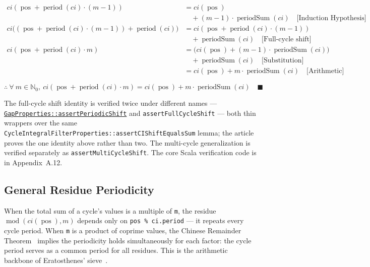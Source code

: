 \begin{equation*}
\begin{aligned}
ci(\operatorname{pos} + \operatorname{period}(ci) \cdot (m - 1)) &= ci(\operatorname{pos}) \\
  &\quad + (m - 1) \cdot \operatorname{periodSum}(ci)
  \quad \text{[Induction Hypothesis]} \\
ci\big((\operatorname{pos} + \operatorname{period}(ci) \cdot (m - 1)) + \operatorname{period}(ci)\big)
  &= ci(\operatorname{pos} + \operatorname{period}(ci) \cdot (m - 1)) \\
  &\quad + \operatorname{periodSum}(ci)
  \quad \text{[Full-cycle shift]} \\
ci(\operatorname{pos} + \operatorname{period}(ci) \cdot m) &= \big(ci(\operatorname{pos}) + (m - 1) \cdot \operatorname{periodSum}(ci)\big) \\
  &\quad + \operatorname{periodSum}(ci)
  \quad \text{[Substitution]} \\
&= ci(\operatorname{pos}) + m \cdot \operatorname{periodSum}(ci)
  \quad \text{[Arithmetic]}
\end{aligned}
\end{equation*}

\begin{equation*}
\therefore \ \forall \ m \in \mathbb{N}_0,\ ci(\operatorname{pos} + \operatorname{period}(ci) \cdot m) = ci(\operatorname{pos}) + m \cdot \operatorname{periodSum}(ci) \quad \blacksquare
\end{equation*}

{\raggedright
The full-cycle shift identity is verified twice under different names ---
\href{https://github.com/thiagomata/prime-numbers/blob/integral-cycle-article-v1.0.0/src/main/scala/v1/chapter4/cycle/integral/recursive/properties/GapProperties.scala}{\texttt{GapProperties::\allowbreak assertPeriodicShift}}
and \texttt{assertFullCycleShift} --- both thin wrappers over the same
\texttt{CycleIntegralFilterProperties::\allowbreak assertCIShiftEqualsSum}
lemma; the article proves the one identity above rather than two. The
multi-cycle generalization is verified separately as
\texttt{assertMultiCycleShift}. The core Scala verification code is in
Appendix~A.12.
\par}

\subsection{General Residue Periodicity}

When the total sum of a cycle's values is a multiple of \texttt{m}, the
residue $\operatorname{mod}(ci(\operatorname{pos}), m)$ depends only on
\texttt{pos \% ci.period} --- it repeats every cycle period. When \texttt{m}
is a product of coprime values, the Chinese Remainder
Theorem~\cite{hardywright1979} implies the periodicity holds simultaneously
for each factor: the cycle period serves as a common period for all
residues. This is the arithmetic backbone of Eratosthenes'
sieve~\cite{hardywright1979}.


